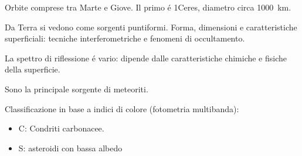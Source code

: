 Orbite comprese tra Marte e Giove. Il primo \'e 1Ceres, diametro circa \SI{1000}{\kilo\meter}.

Da Terra si vedono come sorgenti puntiformi. Forma, dimensioni e caratteristiche superficiali: tecniche interferometriche e fenomeni di occultamento.

La spettro di riflessione \'e vario: dipende dalle caratteristiche chimiche e fisiche della superficie.

Sono la principale sorgente di meteoriti.

Classificazione in base a indici di colore (fotometria multibanda):
\begin{itemize}
    \item C: Condriti carbonacee.
    \item S: asteroidi con bassa albedo
\end{itemize}

